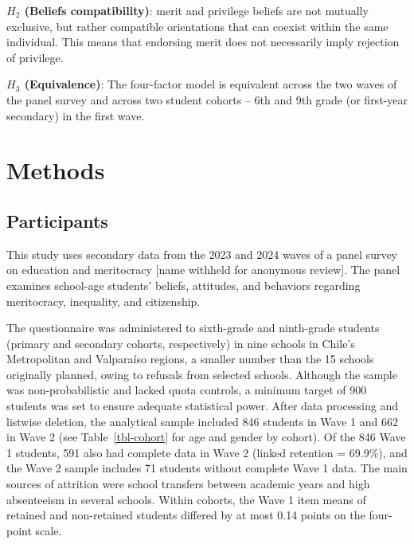 \documentclass[
  11pt,
]{article}
\begin{document}
\textbf{\(H_2\) (Beliefs compatibility)}: merit and privilege beliefs
are not mutually exclusive, but rather compatible orientations that can
coexist within the same individual. This means that endorsing merit does
not necessarily imply rejection of privilege.

\textbf{\(H_3\) (Equivalence)}: The four-factor model is equivalent
across the two waves of the panel survey and across two student cohorts
-- 6th and 9th grade (or first-year secondary) in the first wave.

\section{Methods}\label{methods}

\subsection{Participants}\label{participants}

This study uses secondary data from the 2023 and 2024 waves of a panel
survey on education and meritocracy {[}name withheld for anonymous
review{]}. The panel examines school-age students' beliefs, attitudes,
and behaviors regarding meritocracy, inequality, and citizenship.

The questionnaire was administered to sixth-grade and ninth-grade
students (primary and secondary cohorts, respectively) in nine schools
in Chile's Metropolitan and Valparaíso regions, a smaller number than
the 15 schools originally planned, owing to refusals from selected
schools. Although the sample was non-probabilistic and lacked quota
controls, a minimum target of 900 students was set to ensure adequate
statistical power. After data processing and listwise deletion, the
analytical sample included 846 students in Wave 1 and 662 in Wave 2 (see
Table~\ref{tbl-cohort} for age and gender by cohort). Of the 846 Wave 1
students, 591 also had complete data in Wave 2 (linked retention =
69.9\%), and the Wave 2 sample includes 71 students without complete
Wave 1 data. The main sources of attrition were school transfers between
academic years and high absenteeism in several schools. Within cohorts,
the Wave 1 item means of retained and non-retained students differed by
at most 0.14 points on the four-point scale.
\end{document}

